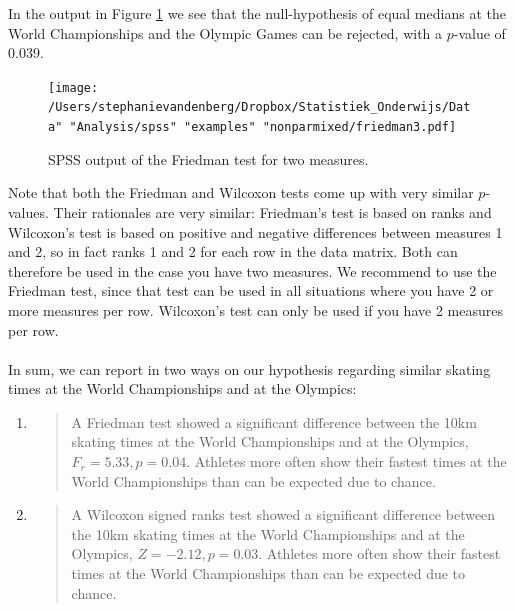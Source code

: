 \documentclass[]{book}\usepackage[]{graphicx}\usepackage[]{color}
\begin{document}
In the output in Figure \ref{fig:friedman3} we see that the null-hypothesis of equal medians at the World Championships and the Olympic Games can be rejected, with a $p$-value of 0.039.

\begin{figure}[h]
    \begin{center}
       \texttt{[image: /Users/stephanievandenberg/Dropbox/Statistiek\_Onderwijs/Data" "Analysis/spss" "examples" "nonparmixed/friedman3.pdf]}
    \end{center}
    \caption{SPSS output of the Friedman test for two measures.}
    \label{fig:friedman3}
\end{figure}



Note that both the Friedman and Wilcoxon tests come up with very similar $p$-values. Their rationales are very similar: Friedman's test is based on ranks and Wilcoxon's test is based on positive and negative differences between measures 1 and 2, so in fact ranks 1 and 2 for each row in the data matrix. Both can therefore be used in the case you have two measures. We recommend to use the Friedman test, since that test can be used in all situations where you have 2 or more measures per row. Wilcoxon's test can only be used if you have 2 measures per row.
\\
\\
In sum, we can report in two ways on our hypothesis regarding similar skating times at the World Championships and at the Olympics:

\begin{enumerate}

\item

\begin{quotation}
A Friedman test showed a significant difference between the 10km skating times at the World Championships and at the Olympics, $F_r = 5.33, p=0.04$. Athletes more often show their fastest times at the World Championships than can be expected due to chance.
\end{quotation}

\item

\begin{quotation}
A Wilcoxon signed ranks test showed a significant difference between the 10km skating times at the World Championships and at the Olympics, $Z = -2.12, p=0.03$. Athletes more often show their fastest times at the World Championships than can be expected due to chance.
\end{quotation}

\end{enumerate}
\end{document}
